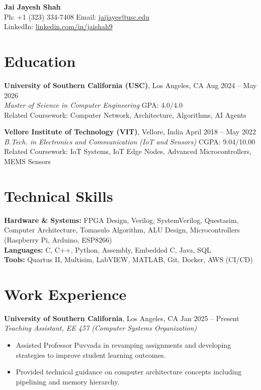 \documentclass[letterpaper,10pt]{article}
\begin{document}
\begin{center}
    {\LARGE \textbf{Jai Jayesh Shah}} \\
    \vspace{5pt}
    \small
    Ph: +1 (323) 334-7408 \quad Email: \href{mailto:jaijayes@usc.edu}{jaijayes@usc.edu} \\
    LinkedIn: \href{https://www.linkedin.com/in/jaishah9}{linkedin.com/in/jaishah9} \\
    \vspace{-8pt}
\end{center}

\section*{Education}
\textbf{University of Southern California (USC)}, Los Angeles, CA \hfill Aug 2024 -- May 2026 \\
\textit{Master of Science in Computer Engineering} \hfill GPA: 4.0/4.0 \\
Related Coursework: Computer Network, Architecture, Algorithms, AI Agents

\vspace{2pt}

\textbf{Vellore Institute of Technology (VIT)}, Vellore, India \hfill April 2018 -- May 2022 \\
\textit{B.Tech. in Electronics and Communication (IoT and Sensors)} \hfill CGPA: 9.04/10.00 \\
Related Coursework: IoT Systems, IoT Edge Nodes, Advanced Microcontrollers, MEMS Sensors

\section*{Technical Skills}
\textbf{Hardware \& Systems:} FPGA Design, Verilog, SystemVerilog, Questasim, Computer Architecture, Tomasulo Algorithm, ALU Design, Microcontrollers (Raspberry Pi, Arduino, ESP8266) \\
\textbf{Languages:} C, C++, Python, Assembly, Embedded C, Java, SQL \\
\textbf{Tools:} Quartus II, Multisim, LabVIEW, MATLAB, Git, Docker, AWS (CI/CD)

\section*{Work Experience}
\textbf{University of Southern California}, Los Angeles, CA \hfill Jan 2025 -- Present \\
\textit{Teaching Assistant, EE 457 (Computer Systems Organization)}
\begin{itemize} \itemsep -2pt
    \item Assisted Professor Puvvada in revamping assignments and developing strategies to improve student learning outcomes.
    \item Provided technical guidance on computer architecture concepts including pipelining and memory hierarchy.
\end{itemize}
\end{document}

